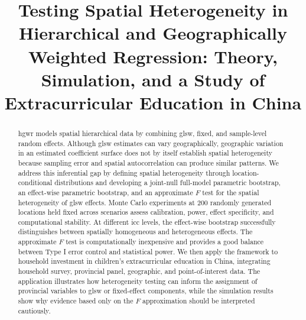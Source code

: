 \documentclass[times]{interact}
\theoremstyle{plain}%
\theoremstyle{definition}
\theoremstyle{remark}
\begin{document}


\title{Testing Spatial Heterogeneity in Hierarchical and Geographically Weighted Regression: Theory, Simulation, and a Study of Extracurricular Education in China}

\author{
}

\maketitle

\begin{abstract}
\Gls{hgwr} models spatial hierarchical data by combining \gls{glsw}, fixed, and sample-level random effects.
Although \gls{glsw} estimates can vary geographically, geographic variation in an estimated coefficient surface does not by itself establish spatial heterogeneity because sampling error and spatial autocorrelation can produce similar patterns.
We address this inferential gap by defining spatial heterogeneity through location-conditional distributions and developing a joint-null full-model parametric bootstrap, an effect-wise parametric bootstrap, and an approximate $F$ test for the spatial heterogeneity of \gls{glsw} effects.
Monte Carlo experiments at 200 randomly generated locations held fixed across scenarios assess calibration, power, effect specificity, and computational stability.
At different \gls{icc} levels, the effect-wise bootstrap successfully distinguishes between spatially homogeneous and heterogeneous effects.
The approximate $F$ test is computationally inexpensive and provides a good balance between Type I error control and statistical power.
We then apply the framework to household investment in children's extracurricular education in China, integrating household survey, provincial panel, geographic, and point-of-interest data.
The application illustrates how heterogeneity testing can inform the assignment of provincial variables to \gls{glsw} or fixed-effect components, while the simulation results show why evidence based only on the $F$ approximation should be interpreted cautiously.
\end{abstract}
\end{document}
